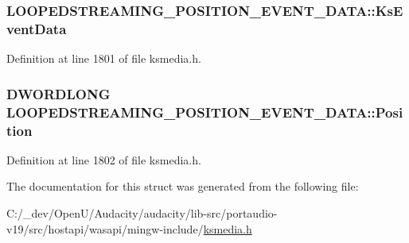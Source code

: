\subsubsection[{\texorpdfstring{Ks\+Event\+Data}{KsEventData}}]{ L\+O\+O\+P\+E\+D\+S\+T\+R\+E\+A\+M\+I\+N\+G\+\_\+\+P\+O\+S\+I\+T\+I\+O\+N\+\_\+\+E\+V\+E\+N\+T\+\_\+\+D\+A\+T\+A\+::\+Ks\+Event\+Data}\hypertarget{struct_l_o_o_p_e_d_s_t_r_e_a_m_i_n_g___p_o_s_i_t_i_o_n___e_v_e_n_t___d_a_t_a_a33f69e0f7cdbdea1cc86069d95737768}{}\label{struct_l_o_o_p_e_d_s_t_r_e_a_m_i_n_g___p_o_s_i_t_i_o_n___e_v_e_n_t___d_a_t_a_a33f69e0f7cdbdea1cc86069d95737768}


Definition at line 1801 of file ksmedia.\+h.

\subsubsection[{\texorpdfstring{Position}{Position}}]{\setlength{\rightskip}{0pt plus 5cm}D\+W\+O\+R\+D\+L\+O\+NG L\+O\+O\+P\+E\+D\+S\+T\+R\+E\+A\+M\+I\+N\+G\+\_\+\+P\+O\+S\+I\+T\+I\+O\+N\+\_\+\+E\+V\+E\+N\+T\+\_\+\+D\+A\+T\+A\+::\+Position}\hypertarget{struct_l_o_o_p_e_d_s_t_r_e_a_m_i_n_g___p_o_s_i_t_i_o_n___e_v_e_n_t___d_a_t_a_acec6802391ed7ff6fce5591a1106d7c2}{}\label{struct_l_o_o_p_e_d_s_t_r_e_a_m_i_n_g___p_o_s_i_t_i_o_n___e_v_e_n_t___d_a_t_a_acec6802391ed7ff6fce5591a1106d7c2}


Definition at line 1802 of file ksmedia.\+h.



The documentation for this struct was generated from the following file\+:\begin{DoxyCompactItemize}
\item 
C\+:/\+\_\+dev/\+Open\+U/\+Audacity/audacity/lib-\/src/portaudio-\/v19/src/hostapi/wasapi/mingw-\/include/\hyperlink{ksmedia_8h}{ksmedia.\+h}\end{DoxyCompactItemize}

